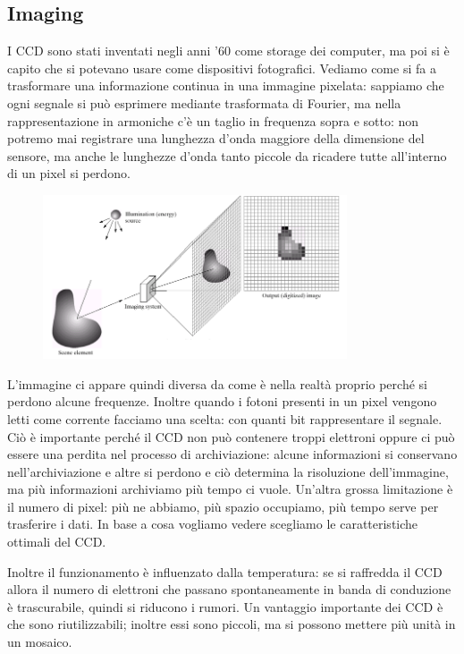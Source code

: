 \subsection{Imaging}
I CCD sono stati inventati negli anni '60 come storage dei computer, ma poi si è capito che si potevano usare come dispositivi fotografici. Vediamo come si fa a trasformare una informazione continua in una immagine pixelata: sappiamo che ogni segnale si può esprimere mediante trasformata di Fourier, ma nella rappresentazione in armoniche c'è un taglio in frequenza sopra e sotto: non potremo mai registrare una lunghezza d'onda maggiore della dimensione del sensore, ma anche le lunghezze d'onda tanto piccole da ricadere tutte all'interno di un pixel si perdono.
 
\begin{figure}[H]
   \centering
   \includegraphics[width=9cm]{astro6.png}
\end{figure}

L'immagine ci appare quindi diversa da come è nella realtà proprio perché si perdono alcune frequenze. Inoltre quando i fotoni presenti in un pixel vengono letti come corrente facciamo una scelta: con quanti bit rappresentare il segnale. Ciò è importante perché il CCD non può contenere troppi elettroni oppure ci può essere una perdita nel processo di archiviazione: alcune informazioni si conservano nell'archiviazione e altre si perdono e ciò determina la risoluzione dell'immagine, ma più informazioni archiviamo più tempo ci vuole. Un'altra grossa limitazione è il numero di pixel: più ne abbiamo, più spazio occupiamo, più tempo serve per trasferire i dati. In base a cosa vogliamo vedere scegliamo le caratteristiche ottimali del CCD.

Inoltre il funzionamento è influenzato dalla temperatura: se si raffredda il CCD allora il numero di elettroni che passano spontaneamente in banda di conduzione è trascurabile, quindi si riducono i rumori. Un vantaggio importante dei CCD è che sono riutilizzabili; inoltre essi sono piccoli, ma si possono mettere più unità in un mosaico.

